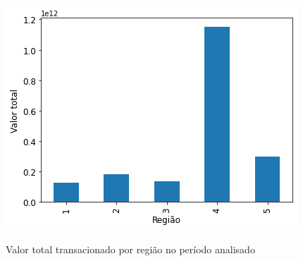\begin{figure}[htb]
	\centering
    \caption{Valor total transacionado por região no período analisado}
    \includegraphics[scale=0.7]{images/base-de-dados-11.1-valor-total-por-regiao.png}
    \label{fig:pandemia:descritiva-11.1-valor-total-por-regiao}
    \fdadospesquisa
\end{figure}

